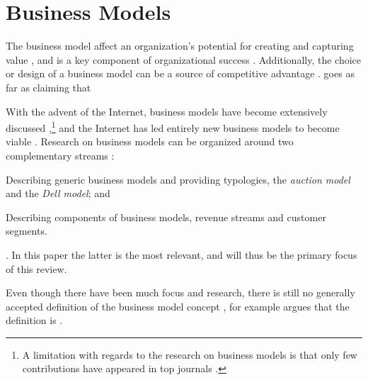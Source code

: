 \section{Business Models}
\label{section:businessmodels}

The business model affect an organization's potential for creating and capturing value \citep{amit2001}, and is a key component of organizational success \citep{badenfuller2010,chesbrough2010}. Additionally, the choice or design of a business model can be a source of competitive advantage \citep{christensen2001,gambardella2010,teece2010,malone2006,masanell2010,zott2008}. \citet[]{chesbrough2007} goes as far as claiming that 

With the advent of the Internet, business models have become extensively discussed \citep{rajala2003,zott2008,demil2010,ghaziani2005,sosna2010,teece2010},\footnote{A limitation with regards to the research on business models is that only few contributions have appeared in top journals \citep{zott2010b}.} and the Internet has led entirely new business models to become viable \citep{petrovic01,geoffrion2003}. Research on business models can be organized around two complementary streams \citep{zott2010b}: 
\begin{enump}
  \item Describing generic business models and providing typologies, \eg the \emph{auction model} and the \emph{Dell model}; and
  \item Describing components of business models, \eg revenue streams and customer segments.
\end{enump}. In this paper the latter is the most relevant, and will thus be the primary focus of this review.


Even though there have been much focus and research, there is still no generally accepted definition of the business model concept \citep[\eg][]{shafer2005,pateli2004,osterwalder2005,teece2010,badenfuller2010models,zott2010b}, for example \citet[]{porter2001} argues that the definition is . 

